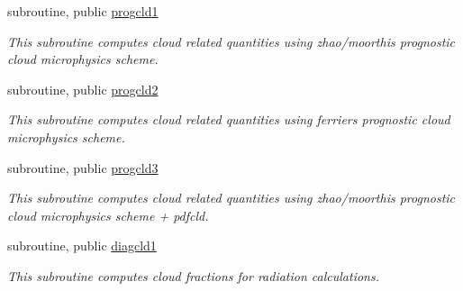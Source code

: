 {\bf }\par
\begin{DoxyCompactItemize}
\item 
subroutine, public \hyperlink{namespacemodule__radiation__clouds_ab45374e1eeec7d6211284b38c3ec8448}{progcld1}                                                                                           
\begin{DoxyCompactList}\small\item\em This subroutine computes cloud related quantities using zhao/moorthi\textquotesingle{}s prognostic cloud microphysics scheme. \end{DoxyCompactList}\end{DoxyCompactItemize}

{\bf }\par
\begin{DoxyCompactItemize}
\item 
subroutine, public \hyperlink{namespacemodule__radiation__clouds_a2f45f48505bb69a968c788ff680b5642}{progcld2}                                                                                           
\begin{DoxyCompactList}\small\item\em This subroutine computes cloud related quantities using ferrier\textquotesingle{}s prognostic cloud microphysics scheme. \end{DoxyCompactList}\end{DoxyCompactItemize}

{\bf }\par
\begin{DoxyCompactItemize}
\item 
subroutine, public \hyperlink{namespacemodule__radiation__clouds_a1953118ed22c3b6f8d94ef231b47a08b}{progcld3}                                                                                           
\begin{DoxyCompactList}\small\item\em This subroutine computes cloud related quantities using zhao/moorthi\textquotesingle{}s prognostic cloud microphysics scheme + pdfcld. \end{DoxyCompactList}\end{DoxyCompactItemize}

{\bf }\par
\begin{DoxyCompactItemize}
\item 
subroutine, public \hyperlink{namespacemodule__radiation__clouds_ab477be986b08fe827c44dbe352a23d39}{diagcld1}
\begin{DoxyCompactList}\small\item\em This subroutine computes cloud fractions for radiation calculations. \end{DoxyCompactList}\end{DoxyCompactItemize}

